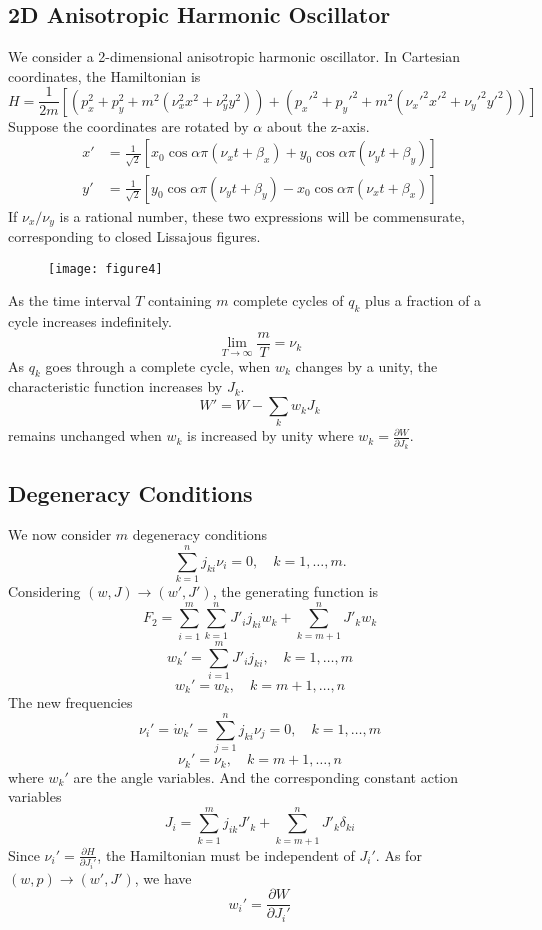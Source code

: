 \documentclass{article}
\begin{document}
	\subsection*{2D Anisotropic Harmonic Oscillator}
	We consider a 2-dimensional anisotropic harmonic oscillator. In Cartesian coordinates, the Hamiltonian is
	\[ H = \frac{1}{2m} [ (p_x^2 + p_y^2 + m^2(\nu_x^2 x^2 + \nu_y^2 y^2)) + (p_x'^2 + p_y'^2 + m^2(\nu_x'^2 x'^2 + \nu_y'^2 y'^2)) ] \]
	Suppose the coordinates are rotated by $\alpha$ about the z-axis.
	\begin{align*}
		x' &= \frac{1}{\sqrt{2}} [x_0 \cos \alpha \pi (\nu_x t + \beta_x) + y_0 \cos \alpha \pi (\nu_y t + \beta_y)] \\
		y' &= \frac{1}{\sqrt{2}} [y_0 \cos \alpha \pi (\nu_y t + \beta_y) - x_0 \cos \alpha \pi (\nu_x t + \beta_x)]
	\end{align*}
	If $\nu_x / \nu_y$ is a rational number, these two expressions will be commensurate, corresponding to closed Lissajous figures. 
	
	\begin{figure}[h]
		\centering
		\texttt{[image: figure4]}
		\caption{}
		\label{fig:figure4}
	\end{figure}
	
	As the time interval $T$ containing $m$ complete cycles of $q_k$ plus a fraction of a cycle increases indefinitely.
	\[ \lim_{T\to\infty} \frac{m}{T} = \nu_k \]
	As $q_k$ goes through a complete cycle, when $w_k$ changes by a unity, the characteristic function increases by $J_k$.
	\[ W' = W - \sum_k w_k J_k \]
	remains unchanged when $w_k$ is increased by unity where $w_k = \frac{\partial W}{\partial J_k}$.
	
	\subsection*{Degeneracy Conditions}
	We now consider $m$ degeneracy conditions
	\[ \sum_{k=1}^n j_{ki} \nu_i = 0, \quad k=1, \dots, m. \]
	Considering $(w, J) \to (w', J')$, the generating function is
	\[ F_2 = \sum_{i=1}^m \sum_{k=1}^n J'_i j_{ki} w_k + \sum_{k=m+1}^n J'_k w_k \]
	\[ w_k' = \sum_{i=1}^m J'_i j_{ki}, \quad k=1, \dots, m \]
	\[ w_k' = w_k, \quad k=m+1, \dots, n \]
	The new frequencies
	\[ \nu_i' = \dot{w}_k' = \sum_{j=1}^n j_{ki} \nu_j = 0, \quad k=1, \dots, m \]
	\[ \nu_k' = \nu_k, \quad k=m+1, \dots, n \]
	where $w_k'$ are the angle variables.
	And the corresponding constant action variables
	\[ J_i = \sum_{k=1}^m j_{ik} J'_k + \sum_{k=m+1}^n J'_k \delta_{ki} \]
	Since $\nu_i' = \frac{\partial H}{\partial J_i'}$, the Hamiltonian must be independent of $J_i'$.
	As for $(w, p) \to (w', J')$, we have
	\[ w_i' = \frac{\partial W}{\partial J_i'} \]
	
\end{document}
